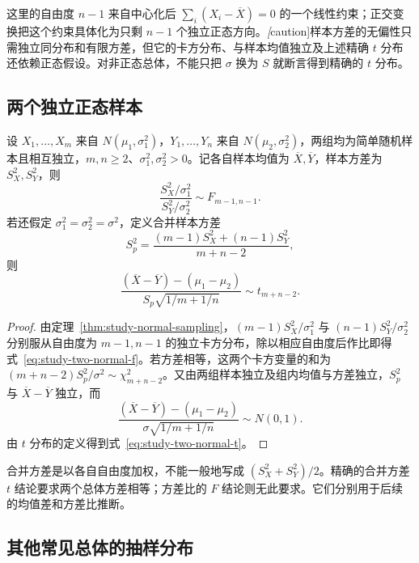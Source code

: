 这里的自由度 $n-1$ 来自中心化后 $\sum_i(X_i-\overline X)=0$ 的一个线性约束；正交变换把这个约束具体化为只剩 $n-1$ 个独立正态方向。\emph[caution]{样本方差的无偏性只需独立同分布和有限方差，但它的卡方分布、与样本均值独立及上述精确 $t$ 分布还依赖正态假设。}对非正态总体，不能只把 $\sigma$ 换为 $S$ 就断言得到精确的 $t$ 分布。

\subsection{两个独立正态样本}

\begin{corollary}
\label{cor:study-two-normal-samples}
设 $X_1,\ldots,X_m$ 来自 $N(\mu_1,\sigma_1^2)$，$Y_1,\ldots,Y_n$ 来自 $N(\mu_2,\sigma_2^2)$，两组均为简单随机样本且相互独立，$m,n\ge2$、$\sigma_1^2,\sigma_2^2>0$。记各自样本均值为 $\overline X,\overline Y$，样本方差为 $S_X^2,S_Y^2$，则
\begin{equation}
  \frac{S_X^2/\sigma_1^2}{S_Y^2/\sigma_2^2}
  \sim F_{m-1,n-1}.
  \label{eq:study-two-normal-f}
\end{equation}
若还假定 $\sigma_1^2=\sigma_2^2=\sigma^2$，定义合并样本方差
\begin{equation}
  S_p^2=\frac{(m-1)S_X^2+(n-1)S_Y^2}{m+n-2},
  \label{eq:study-ch5-pooled-variance}
\end{equation}
则
\begin{equation}
  \frac{(\overline X-\overline Y)-(\mu_1-\mu_2)}
       {S_p\sqrt{1/m+1/n}}
  \sim t_{m+n-2}.
  \label{eq:study-two-normal-t}
\end{equation}
\end{corollary}

\begin{proof}
由定理~\ref{thm:study-normal-sampling}，$(m-1)S_X^2/\sigma_1^2$ 与 $(n-1)S_Y^2/\sigma_2^2$ 分别服从自由度为 $m-1,n-1$ 的独立卡方分布，除以相应自由度后作比即得式~\eqref{eq:study-two-normal-f}。若方差相等，这两个卡方变量的和为 $(m+n-2)S_p^2/\sigma^2\sim\chi^2_{m+n-2}$。又由两组样本独立及组内均值与方差独立，$S_p^2$ 与 $\overline X-\overline Y$ 独立，而
\[
  \frac{(\overline X-\overline Y)-(\mu_1-\mu_2)}
       {\sigma\sqrt{1/m+1/n}}\sim N(0,1).
\]
由 $t$ 分布的定义得到式~\eqref{eq:study-two-normal-t}。
\end{proof}

合并方差是以各自自由度加权，不能一般地写成 $(S_X^2+S_Y^2)/2$。精确的合并方差 $t$ 结论要求两个总体方差相等；方差比的 $F$ 结论则无此要求。它们分别用于后续的均值差和方差比推断。

\subsection{其他常见总体的抽样分布}


